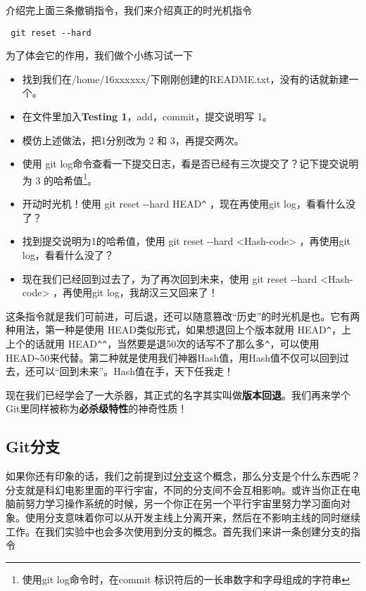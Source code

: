 介绍完上面三条撤销指令，我们来介绍真正的时光机指令

\begin{verbatim}
 git reset --hard
\end{verbatim}

为了体会它的作用，我们做个小练习试一下

\begin{exercise}
	\begin{itemize}
		\item 找到我们在/home/16xxxxxx/下刚刚创建的README.txt，没有的话就新建一个。
		\item 在文件里加入\textbf{Testing 1}，add，commit，提交说明写 1。
		\item 模仿上述做法，把1分别改为 2 和 3，再提交两次。
		\item 使用 git log命令查看一下提交日志，看是否已经有三次提交了？记下提交说明为 3 的哈希值\footnote{使用git log命令时，在commit 标识符后的一长串数字和字母组成的字符串}。
		\item 开动时光机！使用 git reset -{}-hard HEAD\verb|^| ，现在再使用git log，看看什么没了？
		\item 找到提交说明为1的哈希值，使用 git reset -{}-hard <Hash-code> ，再使用git log，看看什么没了？
		\item 现在我们已经回到过去了，为了再次回到未来，使用 git reset -{}-hard <Hash-code> ，再使用git log，我胡汉三又回来了！
	\end{itemize}
\end{exercise}

这条指令就是我们可前进，可后退，还可以随意篡改“历史”的时光机是也。它有两种用法，第一种是使用 HEAD类似形式，如果想退回上个版本就用 HEAD\verb|^|，上上个的话就用 HEAD\verb|^|\verb|^|，当然要是退50次的话写不了那么多\verb|^|，可以使用HEAD\verb|~|50来代替。第二种就是使用我们神器Hash值，用Hash值不仅可以回到过去，还可以“回到未来”。Hash值在手，天下任我走！

现在我们已经学会了一大杀器，其正式的名字其实叫做\textbf{版本回退}。我们再来学个Git里同样被称为\textbf{必杀级特性}的神奇性质！

\subsection{Git分支}
如果你还有印象的话，我们之前提到过\hyperref[分支]{分支}这个概念，那么分支是个什么东西呢？分支就是科幻电影里面的平行宇宙，不同的分支间不会互相影响。或许当你正在电脑前努力学习操作系统的时候，另一个你正在另一个平行宇宙里努力学习面向对象。使用分支意味着你可以从开发主线上分离开来，然后在不影响主线的同时继续工作。在我们实验中也会多次使用到分支的概念。首先我们来讲一条创建分支的指令\label{git branch}

